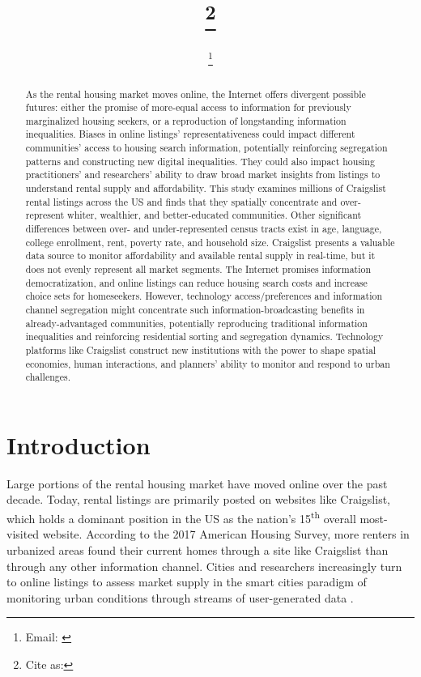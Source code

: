 \documentclass[11pt,letterpaper]{article}
\begin{document}
	
\title{\papertitle\footnote{{Cite as: \papercitation}}}
\date{\paperdate}
\author[]{\myname\footnote{Email: \href{mailto:\myemail}{\myemail}}}
\affil[]{\myaffiliation}

\maketitle

\begin{abstract}
As the rental housing market moves online, the Internet offers divergent possible futures: either the promise of more-equal access to information for previously marginalized housing seekers, or a reproduction of longstanding information inequalities. Biases in online listings' representativeness could impact different communities' access to housing search information, potentially reinforcing segregation patterns and constructing new digital inequalities. They could also impact housing practitioners' and researchers' ability to draw broad market insights from listings to understand rental supply and affordability. This study examines millions of Craigslist rental listings across the US and finds that they spatially concentrate and over-represent whiter, wealthier, and better-educated communities. Other significant differences between over- and under-represented census tracts exist in age, language, college enrollment, rent, poverty rate, and household size. Craigslist presents a valuable data source to monitor affordability and available rental supply in real-time, but it does not evenly represent all market segments. The Internet promises information democratization, and online listings can reduce housing search costs and increase choice sets for homeseekers. However, technology access/preferences and information channel segregation might concentrate such information-broadcasting benefits  in already-advantaged communities, potentially reproducing traditional information inequalities and reinforcing residential sorting and segregation dynamics. Technology platforms like Craigslist construct new institutions with the power to shape spatial economies, human interactions, and planners' ability to monitor and respond to urban challenges.
\vfill
\end{abstract}

\section{Introduction}

Large portions of the rental housing market have moved online over the past decade. Today, rental listings are primarily posted on websites like Craigslist, which holds a dominant position in the US as the nation's 15\textsuperscript{th} overall most-visited website. According to the 2017 American Housing Survey, more renters in urbanized areas found their current homes through a site like Craigslist than through any other information channel. Cities and researchers increasingly turn to online listings to assess market supply in the smart cities paradigm of monitoring urban conditions through streams of user-generated data \citep{boeing_technology_2019}.
\end{document}
